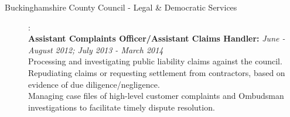 \documentclass[12pt]{article}
\begin{document}
\begin{description}

\item[Buckinghamshire County Council - Legal \& Democratic Services]:\\
\textbf{Assistant Complaints Officer/Assistant Claims Handler:} \emph{June - August 2012; July 2013 - March 2014}\\
Processing and investigating public liability claims against the council. Repudiating claims or requesting settlement from contractors, based on evidence of due diligence/negligence.
\\ Managing case files of high-level customer complaints and Ombudsman investigations to facilitate timely dispute resolution.
\end{description}
\end{document}
